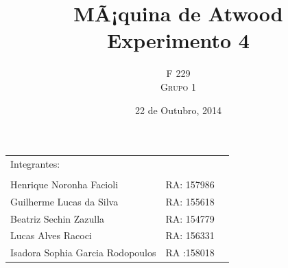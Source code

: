 \documentclass[a4paper]{article}
\title{MÃ¡quina de Atwood \\ Experimento 4} %
\author{F 229 \\ \textsc{Grupo 1}}
\date{22 de Outubro, 2014}
\begin{document}
\maketitle

\begin{center}
	\begin{tabular}{l r l}
		Integrantes:\\\\
		 Henrique Noronha Facioli & RA: 157986 \\
		 Guilherme Lucas da Silva & RA: 155618 \\
		 Beatriz Sechin Zazulla & RA: 154779 \\
		 Lucas Alves Racoci & RA: 156331 \\
		 Isadora Sophia Garcia Rodopoulos & RA :158018 \\
	\end{tabular}
\end{center}

\end{document}
